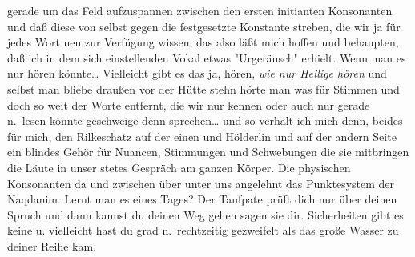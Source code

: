 \documentclass[
]{article}
\begin{document}
gerade um das Feld aufzuspannen zwischen den ersten initianten
Konsonanten und daß diese von selbst gegen die festgesetzte Konstante
streben, die wir ja für jedes Wort neu zur Verfügung wissen; das also
läßt mich hoffen und behaupten, daß ich in dem sich einstellenden Vokal
etwas "Urgeräusch" erhielt. Wenn man es nur hören könnte\ldots{}
Vielleicht gibt es das ja, hören, \emph{wie nur Heilige hören} und
selbst man bliebe draußen vor der Hütte stehn hörte man was für Stimmen
und doch so weit der Worte entfernt, die wir nur kennen oder auch nur
gerade n.~lesen könnte geschweige denn sprechen\ldots{} und so verhalt
ich mich denn, beides für mich, den Rilkeschatz auf der einen und
Hölderlin und auf der andern Seite ein blindes Gehör für Nuancen,
Stimmungen und Schwebungen die sie mitbringen die Läute in unser stetes
Gespräch am ganzen Körper. Die physischen Konsonanten da und zwischen
über unter uns angelehnt das Punktesystem der Naqdanim. Lernt man es
eines Tages? Der Taufpate prüft dich nur über deinen Spruch und dann
kannst du deinen Weg gehen sagen sie dir. Sicherheiten gibt es keine u.
vielleicht hast du grad n.~rechtzeitig gezweifelt als das große Wasser
zu deiner Reihe kam.
\end{document}
